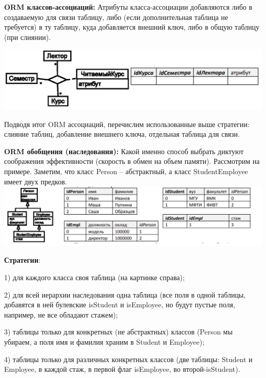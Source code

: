 \textbf{ORM классов-ассоциаций:} Атрибуты класса-ассоциации добавляются либо в создаваемую для связи таблицу, либо (если дополнительная таблица не требуется) в ту таблицу, куда добавляется внешний ключ, либо в общую таблицу (при слиянии).

\includegraphics[scale=0.05]{pics/4_2.png}

Подводя итог ORM ассоциаций, перечислим использованные выше стратегии: слияние таблиц, добавление внешнего ключа, отдельная таблица для связи.

\textbf{ORM обобщения (наследования):}
Какой именно способ выбрать диктуют соображения эффективности (скорость в обмен на объем памяти). Рассмотрим на примере. Заметим, что класс Person – абстрактный, а класс StudentEmployee имеет двух предков.
\includegraphics[scale=0.05]{pics/4_3.png}

\textbf{Стратегии}:

1) для каждого класса своя таблица (на картинке справа);

2) для всей иерархии наследования одна таблица (все поля в одной таблицы, добавятся в ней булевские isStudent и isEmployee, но будут пустые поля, например, не все обладают стажем);

3) таблицы только для конкретных (не абстрактных) классов (Person мы убираем, а поля имя и фамилия храним в Student и Employee);

4) таблицы только для различных конкретных классов (две таблицы: Student и Employee, в каждой стаж, в первой флаг isEmployee, во второй-isStudent).

